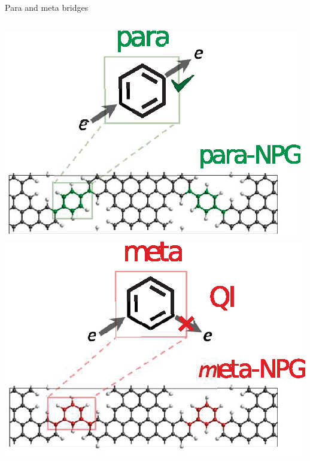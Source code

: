 \documentclass[hyperref={colorlinks=true,urlcolor=blue,linkcolor=.},aspectratio=1610,mathserif]{beamer}
\begin{document}
\begin{frame}{Para and meta bridges}
\centering
\begin{overprint}
\centering
\begin{columns}[t]
    \includegraphics[height=\textwidth]{Figures/Parametagraphic.eps}
    \includegraphics[height=\textwidth]{Figures/Metaparagraphic.eps}

\end{columns}
\end{overprint}
\end{frame}
\end{document}
